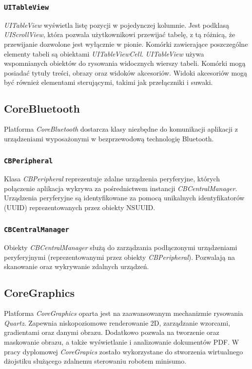  \subsubsection{\lstinline$UITableView$}
\textit{UITableView} wyświetla listę pozycji w pojedynczej kolumnie. Jest podklasą \textit{UIScrollView}, która pozwala użytkownikowi przewijać tabelę, z tą różnicą, że przewijanie dozwolone jest wyłącznie w pionie. Komórki zawierające poszczególne elementy tabeli są obiektami \textit{UITableViewCell}. \textit{UITableView} używa wspomnianych obiektów do rysowania widocznych wierszy tabeli. Komórki mogą posiadać tytuły treści, obrazy oraz widoków akcesoriów. Widoki akcesoriów mogą być również elementami sterującymi, takimi jak przełączniki i suwaki. 

\subsection{CoreBluetooth}
Platforma \textit{CoreBluetooth} dostarcza klasy niezbędne do komunikacji aplikacji z urządzeniami wyposażonymi w bezprzewodową technologię Bluetooth.

 \subsubsection{\lstinline$CBPeripheral$}
Klasa \textit{CBPeripheral} reprezentuje zdalne urządzenia peryferyjne, których połączenie  aplikacja wykrywa za pośrednictwem instancji \textit{CBCentralManager}. Urządzenia peryferyjne są identyfikowane za pomocą unikalnych identyfikatorów (UUID) reprezentowanych przez obiekty NSUUID. 

 \subsubsection{\lstinline$CBCentralManager$}
Obiekty \textit{CBCentralManager} służą do zarządzania podłączonymi urządzeniami peryferyjnymi (reprezentowanymi przez obiekty \textit{CBPeripheral}). Pozwalają na skanowanie oraz wykrywanie zdalnych urządzeń.

\subsection{CoreGraphics}
Platforma \textit{CoreGraphics} oparta jest na zaawansowanym mechanizmie rysowania \textit{Quartz}. Zapewnia niskopoziomowe renderowanie 2D, zarządzanie wzorcami, gradientami oraz danymi obrazu. Dodatkowo pozwala na tworzenie oraz maskowanie obrazu, a także wyświetlanie i analizowanie dokumentów PDF. W pracy dyplomowej \textit{CoreGrapics} zostało wykorzystane do stworzenia wirtualnego dżojstiku służącego zdalnemu sterowaniu robotem minisumo. 

